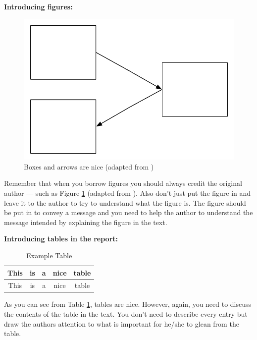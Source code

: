 \documentclass[a4paper]{book}
\begin{document}
\vspace{0.5cm}

\noindent
{\bf Introducing figures:} \\

\begin{figure}[ht]
\begin{center}
\includegraphics[width=0.5\columnwidth]{figs/figure1.pdf}
\caption[Boxes and arrows are nice]{Boxes and arrows are nice (adapted from \citet{authorson10:_secon_best_paper_in_world})}
\label{fig:BoxesAndArrowsAreNice}
\end{center}
\end{figure}

Remember that when you borrow figures you should always credit the original author --- such as Figure \ref{fig:BoxesAndArrowsAreNice} (adapted from \citet{authorson10:_secon_best_paper_in_world}). Also don't just put the figure in and leave it to the author to try to understand what the figure is. The figure should be put in to convey a message and you need to help the author to understand the message intended by explaining the figure in the text. 

\vspace{0.5cm}

\noindent
{\bf Introducing tables in the report: }\\

\begin{table}[htdp]
\begin{center}
\begin{tabular}{|c|c|c|c|c|}\hline\hline
This & is & a & nice & table\\\hline
This & is & a & nice & table\\\hline\hline
\end{tabular}
\caption{Example Table}
\end{center}
\label{tab:ExampleTable}
\end{table}%

As you can see from Table \ref{tab:ExampleTable}, tables are nice. However, again, you need to discuss the contents of the table in the text. You don't need to describe every entry but draw the authors attention to what is important for he/she to glean from the table. 
\end{document}
